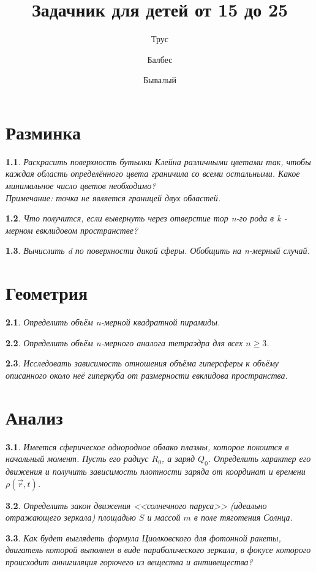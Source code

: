 \documentclass[a4paper]{book}
\author{Трус \and Балбес \and Бывалый}
\title{Задачник для детей от 15 до 25}
\theoremstyle{problemstyle}
\newtheorem{problem}{} %
\begin{document}
    \maketitle
    \tableofcontents
    \chapter{Разминка}
    \begin{problem}
        Раскрасить поверхность бутылки Клейна различными цветами так, чтобы каждая область определённого цвета
        граничила со всеми остальными. Какое минимальное число цветов необходимо?\\
        \textit{Примечание: точка не является границей двух областей.}
    \end{problem}   
    \begin{problem}
        Что получится, если вывернуть через отверстие тор n-го рода в k - мерном евклидовом пространстве?
    \end{problem} 
    \begin{problem}
        Вычислить \int {} d по поверхности дикой сферы. Обобщить на n-мерный случай.
    \end{problem} 
    \chapter{Геометрия}
    \begin{problem}
        Определить объём n-мерной квадратной пирамиды.
    \end{problem}    
    \begin{problem}
        Определить объём n-мерного аналога тетраэдра для всех \( n \ge 3 \).
    \end{problem}
    \begin{problem}
        Исследовать зависимость отношения объёма гиперсферы к объёму описанного
        около неё гиперкуба от размерности евклидова пространства.
    \end{problem}
    \chapter{Анализ}
    \begin{problem}
        Имеется сферическое однородное облако плазмы, которое покоится в
        начальный момент. Пусть его радиус \( R_0 \), а заряд \( Q_0 \).
        Определить характер его движения и получить зависимость плотности заряда
        от координат и времени \( \rho(\vec{r}, t) \).
    \end{problem}
    \begin{problem}
        Определить закон движения <<солнечного паруса>> (идеально отражающего
        зеркала) площадью \( S \) и массой \(m\) в поле тяготения Солнца.
    \end{problem}
    \begin{problem}
        Как будет выглядеть формула Циолковского для фотонной ракеты, двигатель
        которой выполнен в виде параболического зеркала, в фокусе которого
        происходит аннигиляция горючего из вещества и антивещества?
    \end{problem}
\end{document}

